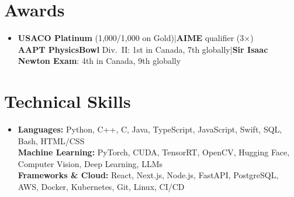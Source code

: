 \documentclass[letterpaper,11pt]{article}
\newlength{\entrygap}\setlength{\entrygap}{6.5pt}        %
\newenvironment{entries}
  {\begin{itemize}[leftmargin=0.12in, label={}, itemsep=\entrygap, topsep=0pt, parsep=0pt, partopsep=0pt]}
  {\end{itemize}}
\begin{document}
\section{Awards}
\begin{entries}
  \item\small
  \textbf{USACO Platinum} (1,000/1,000 on Gold)\hspace{0.5em}$|$\hspace{0.5em}\textbf{AIME} qualifier (3$\times$)\\[1pt]
  \textbf{AAPT PhysicsBowl} Div.\ II: 1st in Canada, 7th globally\hspace{0.5em}$|$\hspace{0.5em}\textbf{Sir Isaac Newton Exam}: 4th in Canada, 9th globally
\end{entries}

\section{Technical Skills}
\begin{entries}
  \item\small
  \textbf{Languages:} Python, C++, C, Java, TypeScript, JavaScript, Swift, SQL, Bash, HTML/CSS\\[1pt]
  \textbf{Machine Learning:} PyTorch, CUDA, TensorRT, OpenCV, Hugging Face, Computer Vision, Deep Learning, LLMs\\[1pt]
  \textbf{Frameworks \& Cloud:} React, Next.js, Node.js, FastAPI, PostgreSQL, AWS, Docker, Kubernetes, Git, Linux, CI/CD
\end{entries}
\end{document}
